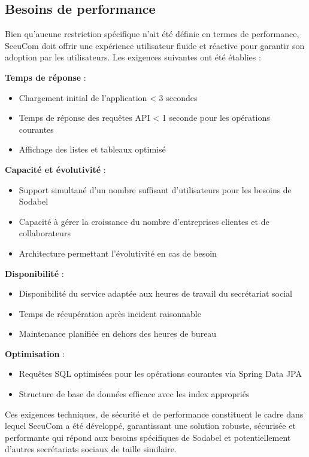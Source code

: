 \documentclass[12pt,a4paper]{report}
\begin{document}
\subsection{Besoins de performance}

Bien qu'aucune restriction spécifique n'ait été définie en termes de performance, SecuCom doit offrir une expérience utilisateur fluide et réactive pour garantir son adoption par les utilisateurs. Les exigences suivantes ont été établies :

\textbf{Temps de réponse} :
\begin{itemize}
  \item Chargement initial de l'application < 3 secondes
  \item Temps de réponse des requêtes API < 1 seconde pour les opérations courantes
  \item Affichage des listes et tableaux optimisé
\end{itemize}

\textbf{Capacité et évolutivité} :
\begin{itemize}
  \item Support simultané d'un nombre suffisant d'utilisateurs pour les besoins de Sodabel
  \item Capacité à gérer la croissance du nombre d'entreprises clientes et de collaborateurs
  \item Architecture permettant l'évolutivité en cas de besoin
\end{itemize}

\textbf{Disponibilité} :
\begin{itemize}
  \item Disponibilité du service adaptée aux heures de travail du secrétariat social
  \item Temps de récupération après incident raisonnable
  \item Maintenance planifiée en dehors des heures de bureau
\end{itemize}

\textbf{Optimisation} :
\begin{itemize}
  \item Requêtes SQL optimisées pour les opérations courantes via Spring Data JPA
  \item Structure de base de données efficace avec les index appropriés
\end{itemize}

Ces exigences techniques, de sécurité et de performance constituent le cadre dans lequel SecuCom a été développé, garantissant une solution robuste, sécurisée et performante qui répond aux besoins spécifiques de Sodabel et potentiellement d'autres secrétariats sociaux de taille similaire.
\end{document}
